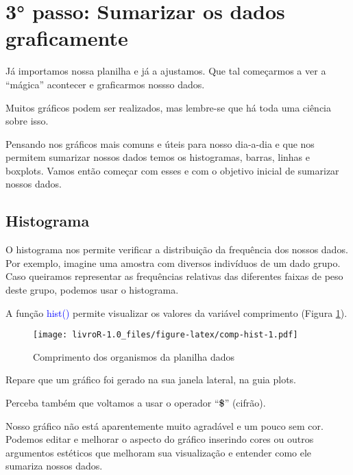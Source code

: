 \documentclass[titlepage, oneside, openany, a4paper]{book}
\newenvironment{Shaded}{\begin{snugshade}}{\end{snugshade}}
\newcommand{\KeywordTok}[1]{\textcolor[rgb]{0.13,0.29,0.53}{\textbf{#1}}}
\newcommand{\NormalTok}[1]{#1}
\newcommand{\OperatorTok}[1]{\textcolor[rgb]{0.81,0.36,0.00}{\textbf{#1}}}
\begin{document}
\hypertarget{passo-sumarizar-os-dados-graficamente}{%
\section{3° passo: Sumarizar os dados graficamente}\label{passo-sumarizar-os-dados-graficamente}}

Já importamos nossa planilha e já a ajustamos. Que tal começarmos a ver a ``mágica'' acontecer e graficarmos nossso dados.

Muitos gráficos podem ser realizados, mas lembre-se que há toda uma ciência sobre isso.

Pensando nos gráficos mais comuns e úteis para nosso dia-a-dia e que nos permitem sumarizar nossos dados temos os histogramas, barras, linhas e boxplots. Vamos então começar com esses e com o objetivo inicial de sumarizar nossos dados.

\hypertarget{histograma}{%
\subsection{Histograma}\label{histograma}}

O histograma nos permite verificar a distribuição da frequência dos nossos dados. Por exemplo, imagine uma amostra com diversos indivíduos de um dado grupo. Caso queiramos representar as frequências relativas das diferentes faixas de peso deste grupo, podemos usar o histograma.

A função \textcolor{blue}{hist()} permite visualizar os valores da variável comprimento (Figura \ref{fig:comp-hist}).

\begin{Shaded}
\end{Shaded}

\begin{figure}
\centering
\texttt{[image: livroR-1.0\_files/figure-latex/comp-hist-1.pdf]}
\caption{\label{fig:comp-hist}Comprimento dos organismos da planilha dados}
\end{figure}

Repare que um gráfico foi gerado na sua janela lateral, na guia plots.

Perceba também que voltamos a usar o operador ``\textbf{\$}'' (cifrão).

Nosso gráfico não está aparentemente muito agradável e um pouco sem cor. Podemos editar e melhorar o aspecto do gráfico inserindo cores ou outros argumentos estéticos que melhoram sua visualização e entender como ele sumariza nossos dados.
\end{document}
